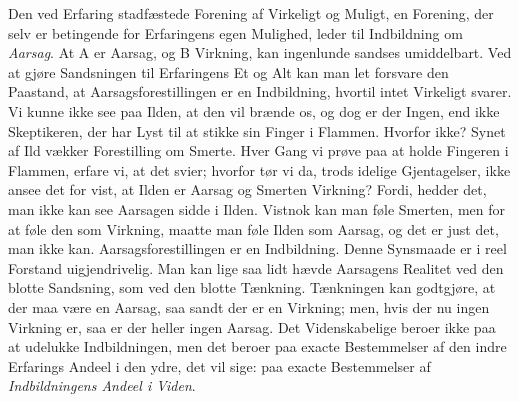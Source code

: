 \documentclass[12pt]{book}
\newcommand{\apage}[1]{\marginnote{\footnotesize\textit{[#1]}}}
\begin{document}
Den ved Erfaring stadfæstede Forening af Virkeligt og Muligt, en Forening,
der selv er betingende for Erfaringens egen Mulighed, leder til
Indbildning \apage{25} om \emph{Aarsag}. At A er Aarsag, og B Virkning, kan ingenlunde
sandses umiddelbart. Ved at gjøre Sandsningen til Erfaringens Et og Alt
kan man let forsvare den Paastand, at Aarsagsforestillingen er en
Indbildning, hvortil intet Virkeligt svarer. Vi kunne ikke see paa Ilden,
at den vil brænde os, og dog er der Ingen, end ikke Skeptikeren, der har
Lyst til at stikke sin Finger i Flammen. Hvorfor ikke? Synet af Ild vækker
Forestilling om Smerte. Hver Gang vi prøve paa at holde Fingeren i
Flammen, erfare vi, at det svier; hvorfor tør vi da, trods idelige
Gjentagelser, ikke ansee det for vist, at Ilden er Aarsag og Smerten
Virkning? Fordi, hedder det, man ikke kan see Aarsagen sidde i Ilden.
Vistnok kan man føle Smerten, men for at føle den som Virkning, maatte man
føle Ilden som Aarsag, og det er just det, man ikke kan.
Aarsagsforestillingen er en Indbildning. Denne Synsmaade er i reel
Forstand uigjendrivelig. Man kan lige saa lidt hævde Aarsagens Realitet
ved den blotte Sandsning, som ved den blotte Tænkning. Tænkningen kan
godtgjøre, at der maa være en Aarsag, saa sandt der er en Virkning; men,
hvis der nu ingen Virkning er, saa er der heller ingen Aarsag. Det
Videnskabelige beroer ikke paa at udelukke Indbildningen, men det beroer
paa exacte Bestemmelser af den indre Erfarings Andeel i den ydre, det vil
sige: paa exacte Bestemmelser af \emph{Indbildningens Andeel i Viden}.
\end{document}
